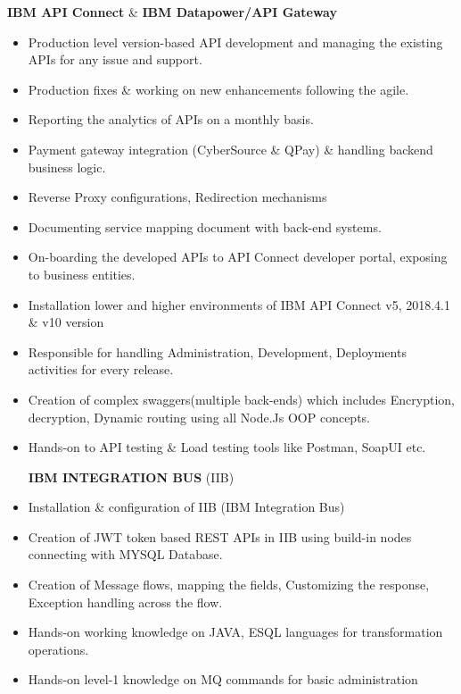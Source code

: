 \documentclass[10pt,a4paper,ragged2e]{altacv}
\begin{document}
\begin{center}
\color{accent}
   \textbf{IBM API Connect} \& \textbf{IBM Datapower/API Gateway}
\end{center}
\begin{itemize}
\item Production level version-based API development and managing the existing APIs for any issue and support.
\item Production fixes \& working on new enhancements following the agile.
\item Reporting the analytics of APIs on a monthly basis.
\item Payment gateway integration (CyberSource \& QPay) \& handling backend business logic.
\item Reverse Proxy configurations, Redirection mechanisms
\item Documenting service mapping document with back-end systems.
\item On-boarding the developed APIs to API Connect developer portal, exposing to business entities.
\item Installation lower and higher environments of IBM API Connect v5, 2018.4.1 \& v10 version
\item Responsible for handling Administration, Development, Deployments activities for every release.
\item Creation of complex swaggers(multiple back-ends) which includes Encryption, decryption, Dynamic routing using all Node.Js OOP concepts.
\item Hands-on to API testing \& Load testing tools like Postman, SoapUI etc.

\begin{center}
\color{accent}
   \textbf{IBM INTEGRATION BUS} (IIB)
\end{center}

\item Installation \& configuration of IIB (IBM Integration Bus)
\item Creation of JWT token based REST APIs in IIB using build-in nodes connecting with MYSQL Database.
\item Creation of Message flows, mapping the fields, Customizing the response, Exception handling across the flow.
\item Hands-on working knowledge on JAVA, ESQL languages for transformation operations.
\item Hands-on level-1 knowledge on MQ commands for basic administration

\end{itemize}
\end{document}
